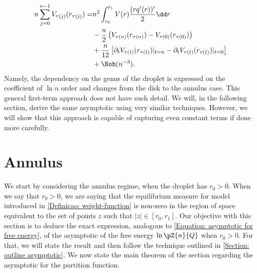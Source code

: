 \begin{align}
		n \sum_{j=0}^{n-1} V_{\tau(j)}(r_{\tau(j)}) = & n^2  \int_{r_0}^{r_1} V(r) \frac{(r q'(r))'}{2} \dd r \\ & - \frac{n}{2} \left( V_{\tau(n)}(r_{\tau(n)})  - V_{\tau(0)}(r_{\tau(0)}) \right)  \\ & + \frac{n}{12} \left[ \partial_t V_{\tau(t)}(r_{\tau(t)}) |_{t=n} - \partial_t V_{\tau(t)}(r_{\tau(t)}) |_{t=0} \right] \\
		& + \Boh(n^{-3}).
\end{align}
Namely, the dependency on the genus of the droplet is expressed on the coefficient of $\ln n$ order and changes from the disk to the annulus case. This general first-term approach does not have such detail. We will, in the following section, derive the same asymptotic using very similar techniques. However, we will show that this approach is capable of capturing even constant terms if done more carefully.

\section{Annulus}
\label{Subsection: Annulus}

We start by considering the annulus regime, when the droplet has $r_0 > 0$. When we say that $r_0 > 0$, we are saying that the equilibrium measure for model introduced in \autoref{Definicao: weight-function} is non-zero in the region of space equivalent to the set of points $z$ such that $|z| \in [r_0, r_1]$. Our objective with this section is to deduce the exact expression, analogous to \eqref{Equation: asymptotic for free energy}, of the asymptotic of the free energy $\ln{\pZ{n}{Q}}$ when $r_0 > 0$. For that, we will state the result and then follow the technique outlined in \autoref{Section: outline asymptotic}. We now state the main theorem of the section regarding the asymptotic for the partition function.

